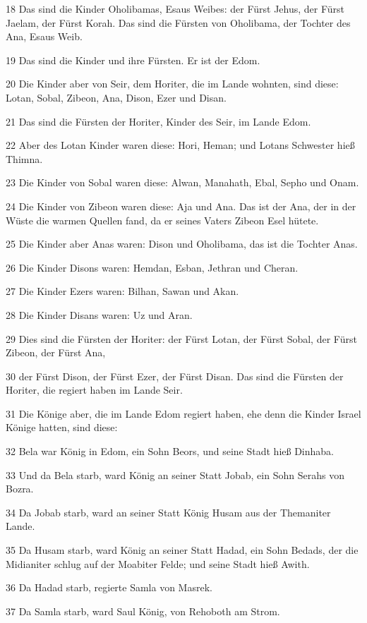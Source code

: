 \par 18 Das sind die Kinder Oholibamas, Esaus Weibes: der Fürst Jehus, der Fürst Jaelam, der Fürst Korah. Das sind die Fürsten von Oholibama, der Tochter des Ana, Esaus Weib.
\par 19 Das sind die Kinder und ihre Fürsten. Er ist der Edom.
\par 20 Die Kinder aber von Seir, dem Horiter, die im Lande wohnten, sind diese: Lotan, Sobal, Zibeon, Ana, Dison, Ezer und Disan.
\par 21 Das sind die Fürsten der Horiter, Kinder des Seir, im Lande Edom.
\par 22 Aber des Lotan Kinder waren diese: Hori, Heman; und Lotans Schwester hieß Thimna.
\par 23 Die Kinder von Sobal waren diese: Alwan, Manahath, Ebal, Sepho und Onam.
\par 24 Die Kinder von Zibeon waren diese: Aja und Ana. Das ist der Ana, der in der Wüste die warmen Quellen fand, da er seines Vaters Zibeon Esel hütete.
\par 25 Die Kinder aber Anas waren: Dison und Oholibama, das ist die Tochter Anas.
\par 26 Die Kinder Disons waren: Hemdan, Esban, Jethran und Cheran.
\par 27 Die Kinder Ezers waren: Bilhan, Sawan und Akan.
\par 28 Die Kinder Disans waren: Uz und Aran.
\par 29 Dies sind die Fürsten der Horiter: der Fürst Lotan, der Fürst Sobal, der Fürst Zibeon, der Fürst Ana,
\par 30 der Fürst Dison, der Fürst Ezer, der Fürst Disan. Das sind die Fürsten der Horiter, die regiert haben im Lande Seir.
\par 31 Die Könige aber, die im Lande Edom regiert haben, ehe denn die Kinder Israel Könige hatten, sind diese:
\par 32 Bela war König in Edom, ein Sohn Beors, und seine Stadt hieß Dinhaba.
\par 33 Und da Bela starb, ward König an seiner Statt Jobab, ein Sohn Serahs von Bozra.
\par 34 Da Jobab starb, ward an seiner Statt König Husam aus der Themaniter Lande.
\par 35 Da Husam starb, ward König an seiner Statt Hadad, ein Sohn Bedads, der die Midianiter schlug auf der Moabiter Felde; und seine Stadt hieß Awith.
\par 36 Da Hadad starb, regierte Samla von Masrek.
\par 37 Da Samla starb, ward Saul König, von Rehoboth am Strom.
